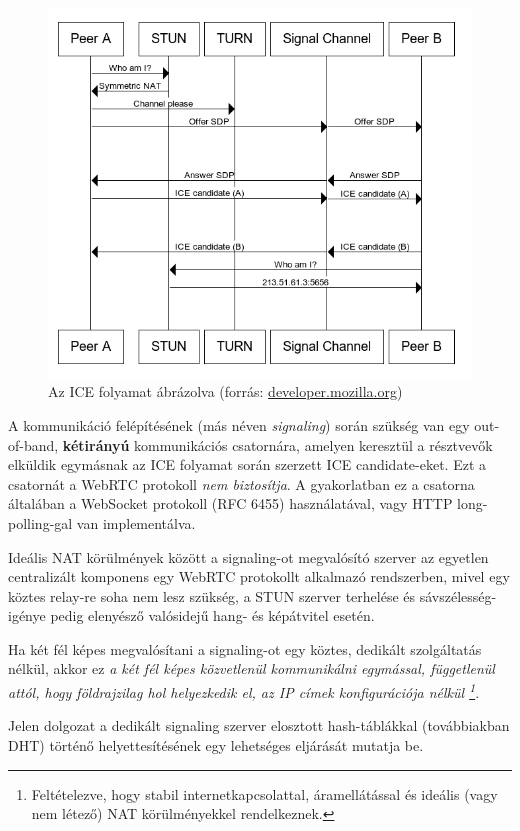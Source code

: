 \begin{figure}[!ht]
    \centering
    \includegraphics[width=150mm, keepaspectratio]{figures/ice}
    \caption{Az ICE folyamat ábrázolva (forrás: \href{https://developer.mozilla.org/en-US/docs/Web/API/WebRTC_API/Connectivity}{developer.mozilla.org})}
    \label{fig:ice}
\end{figure}

A kommunikáció felépítésének (más néven \emph{signaling}) során szükség van egy out-of-band, \textbf{kétirányú}
kommunikációs csatornára, amelyen keresztül a résztvevők elküldik egymásnak az ICE folyamat során szerzett ICE candidate-eket.
Ezt a csatornát a WebRTC protokoll \emph{nem biztosítja}.
A gyakorlatban ez a csatorna általában a WebSocket protokoll (RFC 6455\cite{WebSocket}) használatával, vagy HTTP long-polling-gal van
implementálva.

Ideális NAT körülmények között a signaling-ot megvalósító szerver az egyetlen centralizált komponens egy WebRTC protokollt
alkalmazó rendszerben, mivel egy köztes relay-re soha nem lesz szükség, a STUN szerver terhelése és sávszélesség-igénye
pedig elenyésző valósidejű hang- és képátvitel esetén.

Ha két fél képes megvalósítani a signaling-ot egy köztes, dedikált szolgáltatás nélkül, akkor ez \emph{a két fél képes közvetlenül
kommunikálni egymással, függetlenül attól, hogy földrajzilag hol helyezkedik el, az IP címek konfigurációja nélkül
\footnote{Feltételezve, hogy stabil internetkapcsolattal, áramellátással és ideális (vagy nem létező) NAT körülményekkel rendelkeznek.}}.

Jelen dolgozat a dedikált signaling szerver elosztott hash-táblákkal (továbbiakban DHT) történő helyettesítésének egy
lehetséges eljárását mutatja be.
